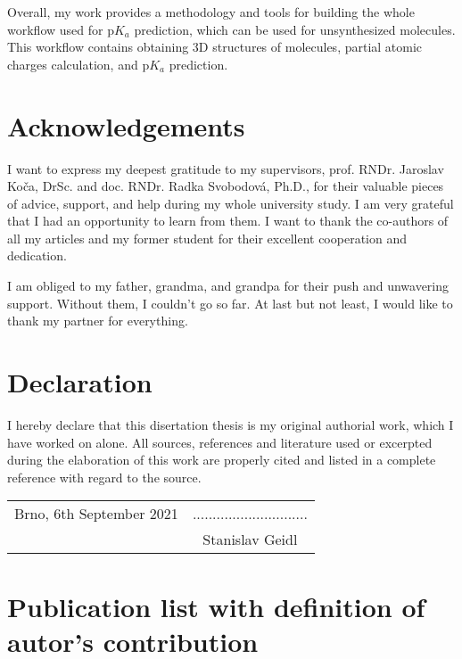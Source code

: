 \documentclass[11pt,b5paper,oneside,final]{book}
\begin{document}
Overall, my work provides a methodology and tools for building the whole
workflow used for p$K_a$ prediction, which can be used for unsynthesized
mo\-le\-cules. This workflow contains obtaining 3D structures of mo\-le\-cu\-les,
partial atomic charges calculation, and p$K_a$ prediction.

\clearpage

\vspace*{13cm}
\section*{Acknowledgements}
I want to express my deepest gratitude to my supervisors, prof. RNDr. Jaroslav
Ko\v{c}a, DrSc. and doc. RNDr. Radka Svobodov\'a, Ph.D., for their valuable
pieces of advice, support, and help during my whole
university study. I am very grateful that I had an opportunity to learn from them.
I want to thank the co-authors of all my articles and my former student for their
excellent cooperation and dedication.

I am obliged to my father, grandma, and grandpa for their push and unwavering
support. Without them, I couldn't go so far. At last but not least, I would like
to thank my partner for everything.
\clearpage

\vspace*{13cm}
\section*{Declaration}
I hereby declare that this disertation thesis is my original authorial work,
which I have worked on alone. All sources, references and literature used or
excerpted during the elaboration of this work are properly cited and listed
in a complete reference with regard to the source.

\vspace{1cm}

\begin{tabular}{p{5cm}c}
Brno, 6th September 2021  & ............................. \\
                          & Stanislav Geidl \\
\end{tabular}
\clearpage

\section*{Publication list with definition of autor's contribution}
\end{document}
